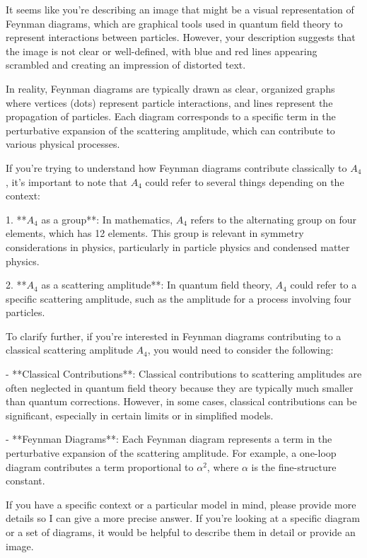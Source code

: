 It seems like you're describing an image that might be a visual representation of Feynman diagrams, which are graphical tools used in quantum field theory to represent interactions between particles. However, your description suggests that the image is not clear or well-defined, with blue and red lines appearing scrambled and creating an impression of distorted text.

In reality, Feynman diagrams are typically drawn as clear, organized graphs where vertices (dots) represent particle interactions, and lines represent the propagation of particles. Each diagram corresponds to a specific term in the perturbative expansion of the scattering amplitude, which can contribute to various physical processes.

If you're trying to understand how Feynman diagrams contribute classically to \(A_4\), it's important to note that \(A_4\) could refer to several things depending on the context:

1. **\(A_4\) as a group**: In mathematics, \(A_4\) refers to the alternating group on four elements, which has 12 elements. This group is relevant in symmetry considerations in physics, particularly in particle physics and condensed matter physics.
   
2. **\(A_4\) as a scattering amplitude**: In quantum field theory, \(A_4\) could refer to a specific scattering amplitude, such as the amplitude for a process involving four particles.

To clarify further, if you're interested in Feynman diagrams contributing to a classical scattering amplitude \(A_4\), you would need to consider the following:

- **Classical Contributions**: Classical contributions to scattering amplitudes are often neglected in quantum field theory because they are typically much smaller than quantum corrections. However, in some cases, classical contributions can be significant, especially in certain limits or in simplified models.

- **Feynman Diagrams**: Each Feynman diagram represents a term in the perturbative expansion of the scattering amplitude. For example, a one-loop diagram contributes a term proportional to \(\alpha^2\), where \(\alpha\) is the fine-structure constant.

If you have a specific context or a particular model in mind, please provide more details so I can give a more precise answer. If you're looking at a specific diagram or a set of diagrams, it would be helpful to describe them in detail or provide an image.